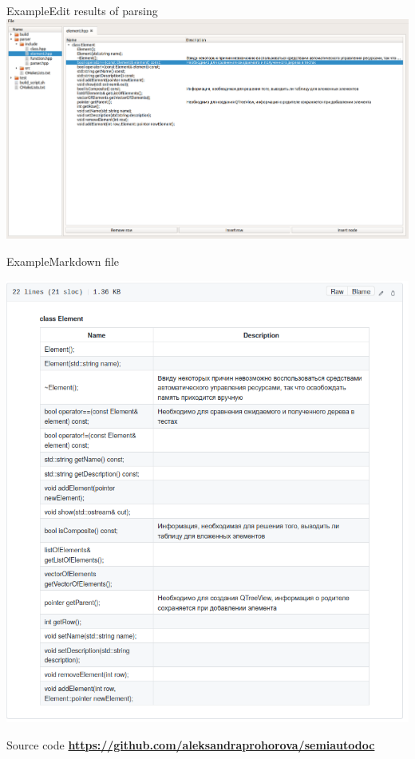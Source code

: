 \documentclass{beamer}
\begin{document}
\begin{frame}
{Example}{Edit results of parsing}
\includegraphics[scale = 0.28]{edit.png}


\end{frame}

\begin{frame}
{Example}{Markdown file}

\includegraphics[scale = 0.4]{markdown.png}

\end{frame}


\begin{frame}
{Source code}
\href{https://github.com/aleksandraprohorova/semiautodoc}{\textbf{https://github.com/aleksandraprohorova/semiautodoc}}\\
\end{frame}
\end{document}
